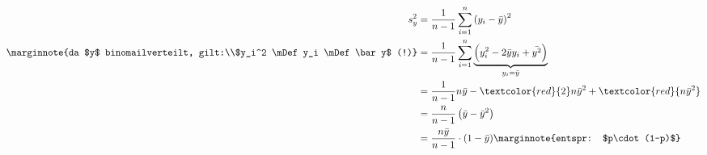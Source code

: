 
\begin{align*}
s^2_y&=\frac{1}{n-1}\sum^{n}_{i=1} \left(y_i - \bar
y\right)^2\\
\marginnote{da $y$ binomailverteilt, gilt:\\$y_i^2 \mDef y_i \mDef \bar y$ (!)}
&=\frac{1}{n-1}\sum^{n}_{i=1} \underbrace{ \left({y_i^2} - 2\bar{y}y_i +
\bar{y^2} \right)}_{y_i = \bar y}\\
&=\frac{1}{n-1}n \bar y -
\textcolor{red}{2}n \bar y^2 + \textcolor{red}{n \bar y^2}\\
&=\frac{n}{n-1}\left( \bar y - \bar y^2\right)\\
&=\frac{n\bar y}{n-1}\cdot (1 -
\bar y)\marginnote{entspr: $p\cdot(1-p)$}\\
\end{align*}
